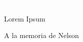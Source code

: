 \cleardoublepage
\thispagestyle{empty}
{\textcolor{white}{.}}
\vspace{40mm}
\epigraph{Lorem Ipsum}{A la memoria de Nelson}
\cleardoublepage

